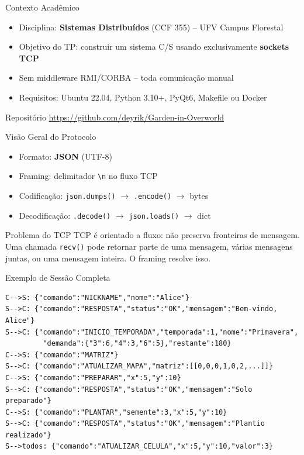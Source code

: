 \documentclass[aspectratio=169]{beamer}
\begin{document}
\begin{frame}{Contexto Acad\^emico}
  \begin{itemize}
    \item Disciplina: \textbf{Sistemas Distribu\'idos} (CCF 355) -- UFV Campus Florestal
    \item Objetivo do TP: construir um sistema C/S usando exclusivamente \textbf{sockets TCP}
    \item Sem middleware RMI/CORBA -- toda comunica\c{c}\~ao manual
    \item Requisitos: Ubuntu 22.04, Python 3.10+, PyQt6, Makefile ou Docker
  \end{itemize}
  \vfill
  \begin{block}{Reposit\'orio}
    \url{https://github.com/deyrik/Garden-in-Overworld}
  \end{block}
\end{frame}

\begin{frame}{Vis\~ao Geral do Protocolo}
  \begin{itemize}
    \item Formato: \textbf{JSON} (UTF-8)
    \item Framing: delimitador \texttt{\textbackslash n} no fluxo TCP
    \item Codifica\c{c}\~ao: \texttt{json.dumps()} $\rightarrow$ \texttt{.encode()} $\rightarrow$ bytes
    \item Decodifica\c{c}\~ao: \texttt{.decode()} $\rightarrow$ \texttt{json.loads()} $\rightarrow$ dict
  \end{itemize}
  \vfill
  \begin{block}{Problema do TCP}
    TCP \'e orientado a fluxo: n\~ao preserva fronteiras de mensagem. Uma chamada \texttt{recv()} pode retornar parte de uma mensagem, v\'arias mensagens juntas, ou uma mensagem inteira. O framing resolve isso.
  \end{block}
\end{frame}

\begin{frame}[fragile]{Exemplo de Sess\~ao Completa}
\begin{lstlisting}[style=json, basicstyle=\ttfamily\scriptsize]
C-->S: {"comando":"NICKNAME","nome":"Alice"}
S-->C: {"comando":"RESPOSTA","status":"OK","mensagem":"Bem-vindo, Alice"}
S-->C: {"comando":"INICIO_TEMPORADA","temporada":1,"nome":"Primavera",
         "demanda":{"3":6,"4":3,"6":5},"restante":180}
C-->S: {"comando":"MATRIZ"}
S-->C: {"comando":"ATUALIZAR_MAPA","matriz":[[0,0,0,1,0,2,...]]}
C-->S: {"comando":"PREPARAR","x":5,"y":10}
S-->C: {"comando":"RESPOSTA","status":"OK","mensagem":"Solo preparado"}
C-->S: {"comando":"PLANTAR","semente":3,"x":5,"y":10}
S-->C: {"comando":"RESPOSTA","status":"OK","mensagem":"Plantio realizado"}
S-->todos: {"comando":"ATUALIZAR_CELULA","x":5,"y":10,"valor":3}
\end{lstlisting}
\end{frame}
\end{document}
